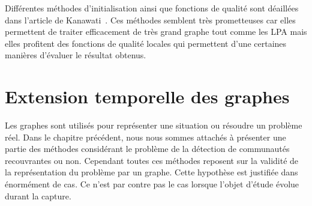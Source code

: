 Différentes méthodes d'initialisation ainsi que fonctions de qualité sont déaillées dans l'article de Kanawati~\cite{Kanawati2014}.
Ces méthodes semblent très prometteuses car elles permettent de traiter efficacement de très grand graphe tout comme les LPA mais elles profitent des fonctions de qualité locales qui permettent d'une certaines manières d'évaluer le résultat obtenus.




\section{Extension temporelle des graphes}
\label{sec:intro_extension_temporelle}

Les graphes sont utilisés pour représenter une situation ou résoudre un problème réel.
Dans le chapitre précédent, nous nous sommes attachés à présenter une partie des méthodes considérant le problème de la détection de communautés recouvrantes ou non.
Cependant toutes ces méthodes reposent sur la validité de la représentation du problème par un graphe.
Cette hypothèse est justifiée dans énormément de cas.
Ce n'est par contre pas le cas lorsque l'objet d'étude évolue durant la capture.

